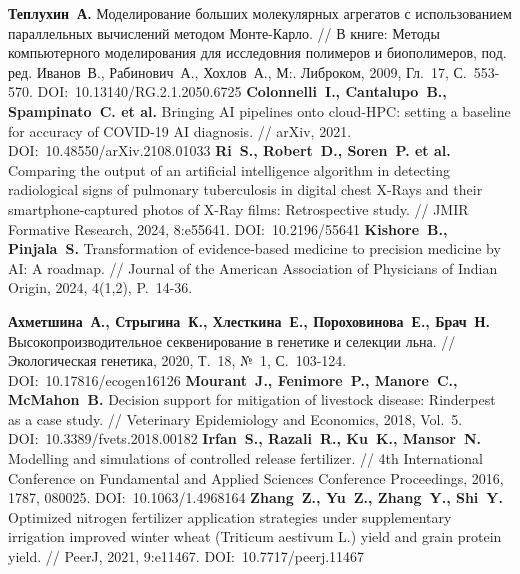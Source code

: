 \begin{thebibliography}{99}
%
\textbf{Теплухин~А.} Моделирование больших молекулярных агрегатов с использованием параллельных вычислений методом Монте-Карло. // В книге: Методы компьютерного моделирования для исследовния полимеров и биополимеров, под. ред. Иванов~В., Рабинович~А., Хохлов~А., М:. Либроком, 2009, Гл.~17, С.~553-570. DOI:~10.13140/RG.2.1.2050.6725
%
\textbf{Colonnelli~I., Cantalupo~B., Spampinato~C. et al.} Bringing AI pipelines onto cloud-HPC: setting a baseline for accuracy of COVID-19 AI diagnosis. // arXiv, 2021. DOI:~10.48550/arXiv.2108.01033
%
\textbf{Ri~S., Robert~D., Soren~P. et al.} Comparing the output of an artificial intelligence algorithm in detecting radiological signs of pulmonary tuberculosis in digital chest X-Rays and their smartphone-captured photos of X-Ray films: Retrospective study. // JMIR Formative Research, 2024, 8:e55641. DOI:~10.2196/55641
%
\textbf{Kishore~B., Pinjala~S.} Transformation of evidence-based medicine to precision medicine by AI: A roadmap. // Journal of the American Association of Physicians of Indian Origin, 2024, 4(1,2), P.~14-36.
%



%
\textbf{Ахметшина~А., Стрыгина~К., Хлесткина~Е., Пороховинова~Е., Брач~Н.} Высокопроизводительное секвенирование в генетике и селекции льна. // Экологическая генетика, 2020, Т.~18, №~1, С.~103-124. DOI:~10.17816/ecogen16126
%
\textbf{Mourant~J., Fenimore~P., Manore~C., McMahon~B.} Decision support for mitigation of livestock disease: Rinderpest as a case study. // Veterinary Epidemiology and Economics, 2018, Vol.~5. DOI:~10.3389/fvets.2018.00182
%
\textbf{Irfan~S., Razali~R., Ku~K., Mansor~N.} Modelling and simulations of controlled release fertilizer. // 4th International Conference on Fundamental and Applied Sciences Conference Proceedings, 2016, 1787, 080025. DOI:~10.1063/1.4968164
%
\textbf{Zhang~Z., Yu~Z., Zhang~Y., Shi~Y.} Optimized nitrogen fertilizer application strategies under supplementary irrigation improved winter wheat (Triticum aestivum L.) yield and grain protein yield. // PeerJ, 2021, 9:e11467. DOI:~10.7717/peerj.11467
%




\end{thebibliography}
